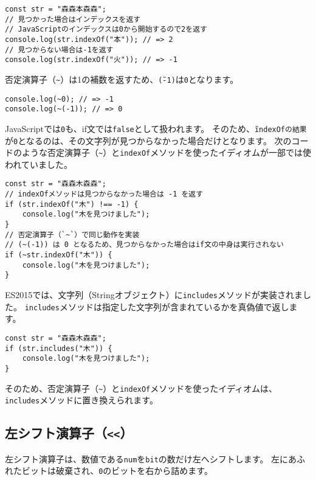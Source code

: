 \begin{lstlisting}
const str = "森森本森森";
// 見つかった場合はインデックスを返す
// JavaScriptのインデックスは0から開始するので2を返す
console.log(str.indexOf("本")); // => 2
// 見つからない場合は-1を返す
console.log(str.indexOf("火")); // => -1
\end{lstlisting}

否定演算子（\texttt{\~}）は1の補数を返すため、\texttt{\~(-1)}は\texttt{0}となります。

\begin{lstlisting}
console.log(~0); // => -1
console.log(~(-1)); // => 0
\end{lstlisting}

JavaScriptでは\texttt{0}も、if文では\texttt{false}として扱われます。
そのため、\texttt{\~indexOfの結果}が\texttt{0}となるのは、その文字列が見つからなかった場合だけとなります。
次のコードのような否定演算子（\texttt{\~}）と\texttt{indexOf}メソッドを使ったイディオムが一部では使われていました。

\begin{lstlisting}
const str = "森森木森森";
// indexOfメソッドは見つからなかった場合は -1 を返す
if (str.indexOf("木") !== -1) {
    console.log("木を見つけました");
}
// 否定演算子（`~`）で同じ動作を実装
// (~(-1)) は 0 となるため、見つからなかった場合はif文の中身は実行されない
if (~str.indexOf("木")) {
    console.log("木を見つけました");
}
\end{lstlisting}

ES2015では、文字列（Stringオブジェクト）に\texttt{includes}メソッドが実装されました。
\texttt{includes}メソッドは指定した文字列が含まれているかを真偽値で返します。

\begin{lstlisting}
const str = "森森木森森";
if (str.includes("木")) {
    console.log("木を見つけました");
}
\end{lstlisting}

そのため、否定演算子（\texttt{\~}）と\texttt{indexOf}メソッドを使ったイディオムは、\texttt{includes}メソッドに置き換えられます。

\hypertarget{left-shift}{%
\subsection{\texorpdfstring{左シフト演算子（\texttt{\textless{}\textless{}}）}{左シフト演算子（\textless{}\textless{}）}}\label{left-shift}}

左シフト演算子は、数値である\texttt{num}を\texttt{bit}の数だけ左へシフトします。
左にあふれたビットは破棄され、\texttt{0}のビットを右から詰めます。

